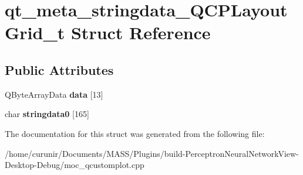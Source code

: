 \hypertarget{structqt__meta__stringdata___q_c_p_layout_grid__t}{}\section{qt\+\_\+meta\+\_\+stringdata\+\_\+\+Q\+C\+P\+Layout\+Grid\+\_\+t Struct Reference}
\label{structqt__meta__stringdata___q_c_p_layout_grid__t}
\subsection*{Public Attributes}
\begin{DoxyCompactItemize}
\item 
Q\+Byte\+Array\+Data {\bfseries data} \mbox{[}13\mbox{]}\hypertarget{structqt__meta__stringdata___q_c_p_layout_grid__t_ab9a2518e0da08ddfb279fb649cdec091}{}\label{structqt__meta__stringdata___q_c_p_layout_grid__t_ab9a2518e0da08ddfb279fb649cdec091}

\item 
char {\bfseries stringdata0} \mbox{[}165\mbox{]}\hypertarget{structqt__meta__stringdata___q_c_p_layout_grid__t_a0592c486ce0adf2a3a83670727f00df2}{}\label{structqt__meta__stringdata___q_c_p_layout_grid__t_a0592c486ce0adf2a3a83670727f00df2}

\end{DoxyCompactItemize}


The documentation for this struct was generated from the following file\+:\begin{DoxyCompactItemize}
\item 
/home/curunir/\+Documents/\+M\+A\+S\+S/\+Plugins/build-\/\+Perceptron\+Neural\+Network\+View-\/\+Desktop-\/\+Debug/moc\+\_\+qcustomplot.\+cpp\end{DoxyCompactItemize}
